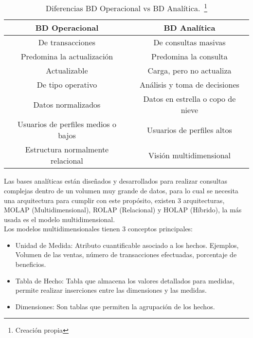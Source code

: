 \begin{table}[H]
	\begin{minipage}{\textwidth} 
		\centering
		\begin{tabular}{ | c | c |}
			\hline
			BD Operacional & BD Analítica\\ \hline
			De transacciones & De consultas masivas \\ \hline
			Predomina la actualización & Predomina la consulta \\ \hline
			Actualizable & Carga, pero no actualiza \\ \hline
			De tipo operativo & Análisis y toma de decisiones \\ \hline
			Datos normalizados & Datos en estrella o copo de nieve \\ \hline
			Usuarios de perfiles medios o bajos & Usuarios de perfiles altos \\ \hline
			Estructura normalmente relacional & Visión multidimensional\\ \hline
		\end{tabular}\newline
		\caption[Diferencias BD Operacional vs BD Analítica.]{Diferencias BD Operacional vs BD Analítica.~\footnote{Creación propia}}
		\label{tabla:bdovsbda}
	\end{minipage}
\end{table}


Las bases analíticas están diseñados y desarrollados para realizar consultas complejas dentro de un volumen muy grande de datos, para lo cual se necesita una arquitectura para cumplir con este propósito, existen 3 arquitecturas, MOLAP (Multidimensional), ROLAP (Relacional) y HOLAP (Híbrido), la más usada es el modelo multidimensional.\\

Los modelos multidimensionales tienen 3 conceptos principales:

\begin{itemize}
    \item Unidad de Medida:
    Atributo cuantificable asociado a los hechos. Ejemplos, Volumen de las ventas, número de transacciones efectuadas, porcentaje de beneficios.
    
    \item Tabla de Hecho:
    Tabla que almacena los valores detallados para medidas, permite realizar inserciones entre las dimensiones y las medidas.
    
    \item Dimensiones:
    Son tablas que permiten la agrupación de los hechos.

\end{itemize}

